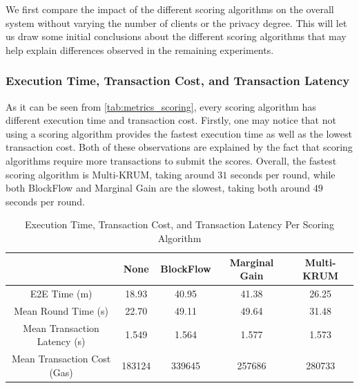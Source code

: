 We first compare the impact of the different scoring algorithms on the overall system without varying the number of clients or the privacy degree. This will let us draw some initial conclusions about the different scoring algorithms that may help explain differences observed in the remaining experiments.

\subsubsection{Execution Time, Transaction Cost, and Transaction Latency}

As it can be seen from \autoref{tab:metrics_scoring}, every scoring algorithm has different execution time and transaction cost. Firstly, one may notice that not using a scoring algorithm provides the fastest execution time as well as the lowest transaction cost. Both of these observations are explained by the fact that scoring algorithms require more transactions to submit the scores. Overall, the fastest scoring algorithm is Multi-KRUM, taking around $31$ seconds per round, while both BlockFlow and Marginal Gain are the slowest, taking both around $49$ seconds per round.

\begin{table}[!ht]
\centering
\begin{tabular}{c|c|c|c|c} \hline \hline
                               & None   & BlockFlow & Marginal Gain & Multi-KRUM \\ \hline \hline
E2E Time (m)                   & 18.93  & 40.95     & 41.38         & 26.25      \\ \hline
Mean Round Time (s)            & 22.70  & 49.11     & 49.64         & 31.48      \\ \hline
Mean Transaction Latency (s)   & 1.549  & 1.564     & 1.577         & 1.573      \\ \hline
Mean Transaction Cost (Gas)    & 183124 & 339645    & 257686        & 280733     \\ \hline
\end{tabular}
\caption{Execution Time, Transaction Cost, and Transaction Latency Per Scoring Algorithm}
\label{tab:metrics_scoring}
\end{table}

